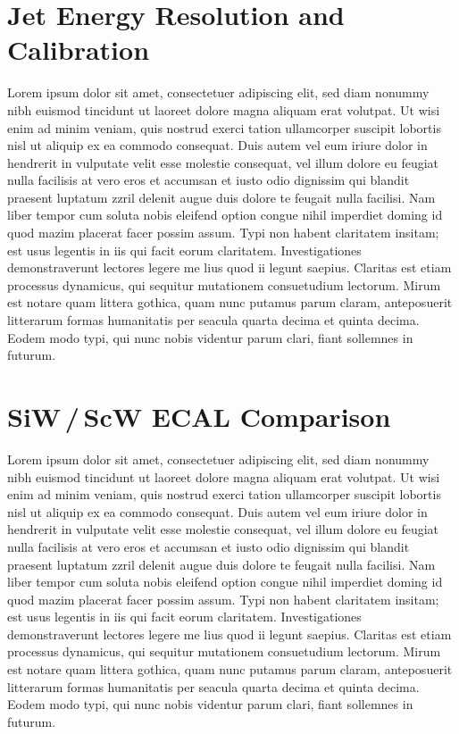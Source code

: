 \documentclass[final,3p,times,twocolumn]{elsarticle}
\begin{document}

\section{Jet Energy Resolution and Calibration}
Lorem ipsum dolor sit amet, consectetuer adipiscing elit, sed diam nonummy nibh euismod tincidunt ut laoreet dolore magna aliquam erat volutpat. Ut wisi enim ad minim veniam, quis
nostrud exerci tation ullamcorper suscipit lobortis nisl ut aliquip ex ea commodo consequat. Duis autem vel eum iriure dolor in hendrerit in vulputate velit esse molestie consequat,
vel illum dolore eu feugiat nulla facilisis at vero eros et accumsan et iusto odio dignissim qui blandit praesent luptatum zzril delenit augue duis dolore te feugait nulla facilisi.
Nam liber tempor cum soluta nobis eleifend option congue nihil imperdiet doming id quod mazim placerat facer possim assum. Typi non habent claritatem insitam; est usus legentis in
iis qui facit eorum claritatem. Investigationes demonstraverunt lectores legere me lius quod ii legunt saepius. Claritas est etiam processus dynamicus, qui sequitur mutationem
consuetudium lectorum. Mirum est notare quam littera gothica, quam nunc putamus parum claram, anteposuerit litterarum formas humanitatis per seacula quarta decima et quinta
decima. Eodem modo typi, qui nunc nobis videntur parum clari, fiant sollemnes in futurum.



\section{SiW\,/\,ScW ECAL Comparison}
Lorem ipsum dolor sit amet, consectetuer adipiscing elit, sed diam nonummy nibh euismod tincidunt ut laoreet dolore magna aliquam erat volutpat. Ut wisi enim ad minim veniam, quis
nostrud exerci tation ullamcorper suscipit lobortis nisl ut aliquip ex ea commodo consequat. Duis autem vel eum iriure dolor in hendrerit in vulputate velit esse molestie consequat,
vel illum dolore eu feugiat nulla facilisis at vero eros et accumsan et iusto odio dignissim qui blandit praesent luptatum zzril delenit augue duis dolore te feugait nulla facilisi.
Nam liber tempor cum soluta nobis eleifend option congue nihil imperdiet doming id quod mazim placerat facer possim assum. Typi non habent claritatem insitam; est usus legentis in
iis qui facit eorum claritatem. Investigationes demonstraverunt lectores legere me lius quod ii legunt saepius. Claritas est etiam processus dynamicus, qui sequitur mutationem
consuetudium lectorum. Mirum est notare quam littera gothica, quam nunc putamus parum claram, anteposuerit litterarum formas humanitatis per seacula quarta decima et quinta
decima. Eodem modo typi, qui nunc nobis videntur parum clari, fiant sollemnes in futurum.
\end{document}

